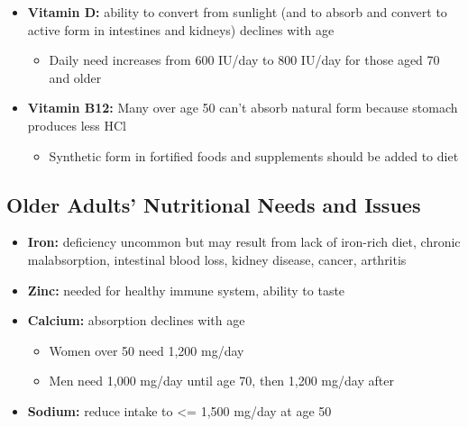 \documentclass[12pt]{article}
\begin{document}
\begin{itemize}
\begin{itemize}
                        \item \textbf{Vitamin D:} ability to convert from sunlight (and to absorb and convert to active form in intestines and kidneys) declines with age
                            \begin{itemize}
                                \item Daily need increases from 600 IU/day to 800 IU/day for those aged 70 and older
                            \end{itemize}
                        \item \textbf{Vitamin B12:} Many over age 50 can't absorb natural form because stomach produces less HCl
                            \begin{itemize}
                                \item Synthetic form in fortified foods and supplements should be added to diet
                            \end{itemize}
                    \end{itemize}
            \end{itemize}

        \subsection{Older Adults' Nutritional Needs and Issues}
            \begin{itemize}
                \item \textbf{Iron:} deficiency uncommon but may result from lack of iron-rich diet, chronic malabsorption, intestinal blood loss, kidney disease, cancer, arthritis
                \item \textbf{Zinc:} needed for healthy immune system, ability to taste
                \item \textbf{Calcium:} absorption declines with age
                    \begin{itemize}
                        \item Women over 50 need 1,200 mg/day
                        \item Men need 1,000 mg/day until age 70, then 1,200 mg/day after
                    \end{itemize}
                \item \textbf{Sodium:} reduce intake to <= 1,500 mg/day at age 50
            \end{itemize}
\end{document}

